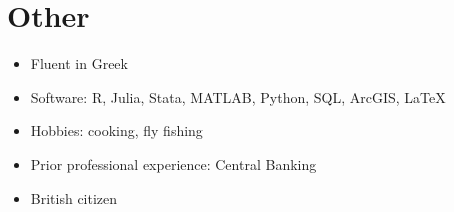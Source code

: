 \documentclass{article}[12]
\begin{document}
\section{Other}

\begin{itemize}[itemsep=0.5em]
    \item Fluent in Greek
    \item Software: R, Julia, Stata, MATLAB, Python, SQL, ArcGIS, \LaTeX
    \item Hobbies: cooking, fly fishing
    \item Prior professional experience: Central Banking
    \item British citizen
\end{itemize}


\thispagestyle{laststyle}
\end{document}
